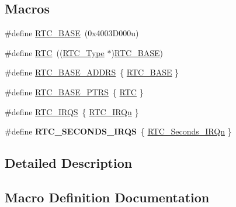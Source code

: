 \subsection*{Macros}
\begin{DoxyCompactItemize}
\item 
\#define \mbox{\hyperlink{group___r_t_c___peripheral___access___layer_ga4265e665d56225412e57a61d87417022}{R\+T\+C\+\_\+\+B\+A\+SE}}~(0x4003\+D000u)
\item 
\#define \mbox{\hyperlink{group___r_t_c___peripheral___access___layer_ga5359a088f5d8b20ce74d920e46059304}{R\+TC}}~((\mbox{\hyperlink{struct_r_t_c___type}{R\+T\+C\+\_\+\+Type}} $\ast$)\mbox{\hyperlink{group___r_t_c___peripheral___access___layer_ga4265e665d56225412e57a61d87417022}{R\+T\+C\+\_\+\+B\+A\+SE}})
\item 
\#define \mbox{\hyperlink{group___r_t_c___peripheral___access___layer_ga417e8fb70b5f6eef161b10f664daa363}{R\+T\+C\+\_\+\+B\+A\+S\+E\+\_\+\+A\+D\+D\+RS}}~\{ \mbox{\hyperlink{group___r_t_c___peripheral___access___layer_ga4265e665d56225412e57a61d87417022}{R\+T\+C\+\_\+\+B\+A\+SE}} \}
\item 
\#define \mbox{\hyperlink{group___r_t_c___peripheral___access___layer_ga426dff8af34f3304d58b5bed5a54e583}{R\+T\+C\+\_\+\+B\+A\+S\+E\+\_\+\+P\+T\+RS}}~\{ \mbox{\hyperlink{group___r_t_c___peripheral___access___layer_ga5359a088f5d8b20ce74d920e46059304}{R\+TC}} \}
\item 
\#define \mbox{\hyperlink{group___r_t_c___peripheral___access___layer_gaa24243a5e7ef8be5eeeedde3eaaa366e}{R\+T\+C\+\_\+\+I\+R\+QS}}~\{ \mbox{\hyperlink{group___interrupt__vector__numbers_gga666eb0caeb12ec0e281415592ae89083adcc0f2770f7f57f75fac3d8bcac0e858}{R\+T\+C\+\_\+\+I\+R\+Qn}} \}
\item 
\mbox{\label{group___r_t_c___peripheral___access___layer_ga9d5d6f8bbcb56fa1073bebb9d130faad}} 
\#define {\bfseries R\+T\+C\+\_\+\+S\+E\+C\+O\+N\+D\+S\+\_\+\+I\+R\+QS}~\{ \mbox{\hyperlink{group___interrupt__vector__numbers_gga666eb0caeb12ec0e281415592ae89083a2212c7b8ea636a7df0c31f21556e4fae}{R\+T\+C\+\_\+\+Seconds\+\_\+\+I\+R\+Qn}} \}
\end{DoxyCompactItemize}


\subsection{Detailed Description}


\subsection{Macro Definition Documentation}
\mbox{\label{group___r_t_c___peripheral___access___layer_ga5359a088f5d8b20ce74d920e46059304}} 
